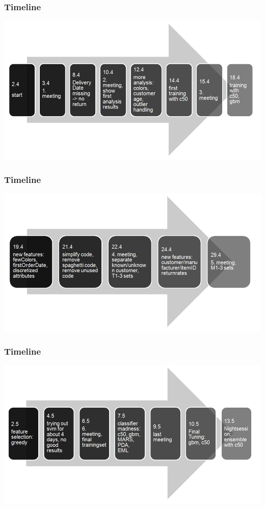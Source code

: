 \documentclass[color=usenames,dvipsnames]{beamer}
\begin{document}
\begin{frame}
\frametitle{Timeline}
	\includegraphics[scale=0.45]{timeline1.png}
\end{frame}

\begin{frame}
\frametitle{Timeline}
	\includegraphics[scale=0.45]{timeline2.png}
\end{frame}

\begin{frame}
\frametitle{Timeline}
	\includegraphics[scale=0.45]{timeline3.png}
\end{frame}
\end{document}
